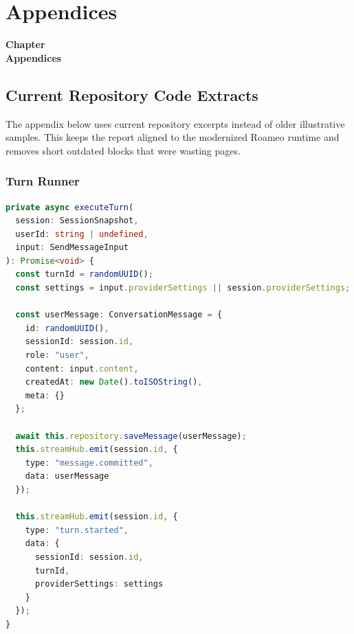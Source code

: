 \documentclass[12pt,a4paper]{report}
\newcommand{\chaptercontentheading}[1]{%
  \thispagestyle{mainstyle}%
  \begin{center}
    {\Large\bfseries Chapter~\thechapter}\\[0.35cm]
    {\Large\bfseries #1}
  \end{center}
  \vspace{0.9cm}
}
\begin{document}
\endgroup




\appendix

\chapter{Appendices}
\chaptercontentheading{Appendices}
\section{Current Repository Code Extracts}

The appendix below uses current repository excerpts instead of older illustrative samples. This keeps the report aligned to the modernized Roameo runtime and removes short outdated blocks that were wasting pages.

\subsection{Turn Runner}

\begin{lstlisting}[language=TypeScript, caption={Current turn runner logic: message persistence, streaming bootstrap, and planning-state control}, label={lst:turnrunner_current_a}]
private async executeTurn(
  session: SessionSnapshot,
  userId: string | undefined,
  input: SendMessageInput
): Promise<void> {
  const turnId = randomUUID();
  const settings = input.providerSettings || session.providerSettings;

  const userMessage: ConversationMessage = {
    id: randomUUID(),
    sessionId: session.id,
    role: "user",
    content: input.content,
    createdAt: new Date().toISOString(),
    meta: {}
  };

  await this.repository.saveMessage(userMessage);
  this.streamHub.emit(session.id, {
    type: "message.committed",
    data: userMessage
  });

  this.streamHub.emit(session.id, {
    type: "turn.started",
    data: {
      sessionId: session.id,
      turnId,
      providerSettings: settings
    }
  });
}
\end{lstlisting}
\end{document}
